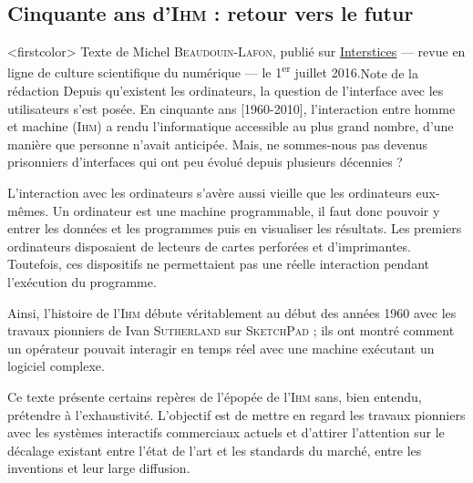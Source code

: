 

\subsection[50 ans d'\textsc{Ihm} : retour vers le futur]{Cinquante ans d'\textsc{Ihm} : retour vers le futur}
\label{sub:I.3.2}


\caution[b]<firstcolor>{%
Texte de Michel  \textsc{Beaudouin-Lafon}, publié sur \href{https://interstices.info/50-ans-dinteraction-homme-machine-retours-vers-le-futur/}{Interstices} --- revue en ligne de culture scientifique du numérique --- le 1\textsuperscript{er} juillet 2016.}{Note de la rédaction}
Depuis qu’existent les ordinateurs, la question de l'interface avec les utilisateurs s'est posée. En cinquante ans [1960-2010], l'interaction entre homme et machine (\textsc{Ihm}) a rendu l'informatique accessible au plus grand nom\-bre, d'une manière que personne n'avait anticipée.
Mais, ne sommes-nous pas devenus prisonniers d’interfaces qui ont peu évolué depuis plusieurs décennies ?

L’interaction avec les ordinateurs s'avère aussi vieille que les ordinateurs eux-mêmes. Un ordinateur est une machine programmable, il faut donc pouvoir y entrer les données et les programmes  puis en visualiser les résultats.
Les premiers ordinateurs disposaient de lecteurs de cartes perforées et d’imprimantes. Toutefois, ces dispositifs ne permettaient pas une réelle interaction pendant l’exécution du programme. 

Ainsi, l’histoire de l’\textsc{Ihm} débute véritablement au début des années 1960 avec les travaux pionniers de Ivan \textsc{Sutherland} sur \textsc{SketchPad} ; ils ont montré comment un opérateur pouvait interagir en temps réel avec une machine exécutant un logiciel complexe.

Ce texte présente certains repères de l'épopée de l'\textsc{Ihm} sans, bien entendu, prétendre à l'exhaustivité. L'objectif est de mettre en regard les travaux pionniers avec les systèmes interactifs commerciaux actuels et d'attirer l'attention sur le décalage existant entre l'état de l'art et les standards du marché, entre les inventions et leur large diffusion.

